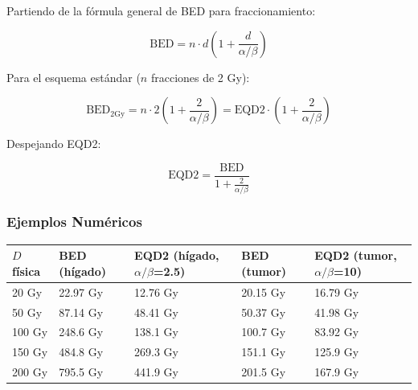 \documentclass[12pt,a4paper]{article}
\begin{document}
Partiendo de la fórmula general de BED para fraccionamiento:

$$\text{BED} = n \cdot d \left(1 + \frac{d}{\alpha/\beta}\right)$$

Para el esquema estándar ($n$ fracciones de 2 Gy):

$$\text{BED}_{2\text{Gy}} = n \cdot 2 \left(1 + \frac{2}{\alpha/\beta}\right) = \text{EQD2} \cdot \left(1 + \frac{2}{\alpha/\beta}\right)$$

Despejando EQD2:

$$\text{EQD2} = \frac{\text{BED}}{1 + \frac{2}{\alpha/\beta}}$$

\subsubsection{Ejemplos Numéricos}

\begin{tabular}{p{2cm} p{3cm} p{3cm} p{3cm} p{3cm}}
\toprule
\textbf{$D$ física} & \textbf{BED (hígado)} & \textbf{EQD2 (hígado, $\alpha/\beta$=2.5)} & \textbf{BED (tumor)} & \textbf{EQD2 (tumor, $\alpha/\beta$=10)} \\
\midrule
20 Gy & 22.97 Gy & 12.76 Gy & 20.15 Gy & 16.79 Gy \\
50 Gy & 87.14 Gy & 48.41 Gy & 50.37 Gy & 41.98 Gy \\
100 Gy & 248.6 Gy & 138.1 Gy & 100.7 Gy & 83.92 Gy \\
150 Gy & 484.8 Gy & 269.3 Gy & 151.1 Gy & 125.9 Gy \\
200 Gy & 795.5 Gy & 441.9 Gy & 201.5 Gy & 167.9 Gy \\
\bottomrule
\end{tabular}
\end{document}
